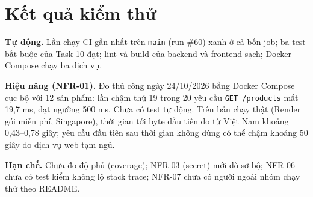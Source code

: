 \section{Kết quả kiểm thử}\label{sec:se-ketquakt}
\textbf{Tự động.} Lần chạy CI gần nhất trên \texttt{main} (run \#60) xanh ở cả bốn job; ba test bắt buộc của Task 10 đạt; lint và build của backend và frontend sạch; Docker Compose chạy ba dịch vụ.

\textbf{Hiệu năng (NFR-01).} Đo thủ công ngày 24/10/2026 bằng Docker Compose cục bộ với 12 sản phẩm: lần chậm thứ 19 trong 20 yêu cầu \texttt{GET /products} mất 19,7 ms, đạt ngưỡng 500 ms. Chưa có test tự động. Trên bản chạy thật (Render gói miễn phí, Singapore), thời gian tới byte đầu tiên đo từ Việt Nam khoảng 0,43--0,78 giây; yêu cầu đầu tiên sau thời gian không dùng có thể chậm khoảng 50 giây do dịch vụ web tạm ngủ.

\textbf{Hạn chế.} Chưa đo độ phủ (coverage); NFR-03 (secret) mới dò sơ bộ; NFR-06 chưa có test kiểm không lộ stack trace; NFR-07 chưa có người ngoài nhóm chạy thử theo README.
